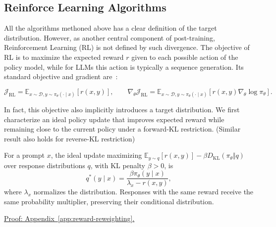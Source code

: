 \subsection{Reinforce Learning Algorithms}

All the algorithms methoned above has a clear definition of the target distribution. However, as another central component of post-training, Reinforcement Learning (RL) is not defined by such divergence. The objective of RL is to maximize the expected reward $r$ given to each possible action of the policy model, while for LLMs this action is typically a sequence generation. Its standard objective and gradient are~\citep{williams_simple_1992}:

\begin{equation}
  \mathcal{J}_{\mathrm{RL}} = \mathbb{E}_{x\sim\mathcal{D}, y\sim\pi_\theta (\cdot\mid x)} [r(x, y)],\qquad \nabla_\theta \mathcal{J}_{\mathrm{RL}} = \mathbb{E}_{x\sim\mathcal{D}, y\sim\pi_\theta (\cdot\mid x)} [r(x, y) \nabla_\theta \log \pi_\theta].
  \label{eq:std-rfalgo}
\end{equation}


In fact, this objective also implicitly introduces a target distribution. We first characterize an ideal policy update that improves expected reward
while remaining close to the current policy under a forward-KL restriction. (Similar result also holds for reverse-KL restriction)

\begin{theorem}
\label{lem:reward-reweighting}
For a prompt $x$, the ideal update maximizing
$\mathbb E_{y\sim q}[r(x,y)]-\beta D_{\mathrm{KL}}(\pi_\theta\Vert q)$
over response distributions $q$, with KL penalty $\beta>0$, is
\begin{equation}
 q^*(y\mid x)
 =\frac{\beta\pi_\theta(y\mid x)}{\lambda_x-r(x,y)},
 \label{eq:reward-reciprocal-tilt}
\end{equation}
where $\lambda_x$ normalizes the distribution. Responses with the same
reward receive the same probability multiplier, preserving their
conditional distribution.
\end{theorem}
\noindent\hyperref[app:reward-reweighting]{Proof: Appendix~\ref*{app:reward-reweighting}.}

